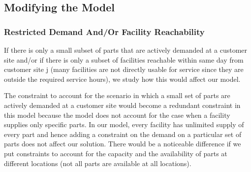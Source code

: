 \documentclass[12pt]{article}
\numberwithin{equation}{section}
\begin{document}
\subsection{Modifying the Model}
\subsubsection{Restricted Demand And/Or Facility Reachability}
If there is only a small subset of parts that are actively demanded at a customer site and/or if
there is only a subset of facilities reachable within same day from customer site j (many facilities
are not directly usable for service since they are outside the required service hours), we study how this would affect our model.

The constraint to account for the scenario in which a small set of parts are actively demanded at a customer site would become a redundant constraint in this model because the model does not account for the case when a facility supplies only specific parts. In our model, every facility has unlimited supply of every part and hence adding a constraint on the demand on a particular set of parts does not affect our solution. There would be a noticeable difference if we put constraints to account for the capacity and the availability of parts at different locations (not all parts are available at all locations).
\end{document}

